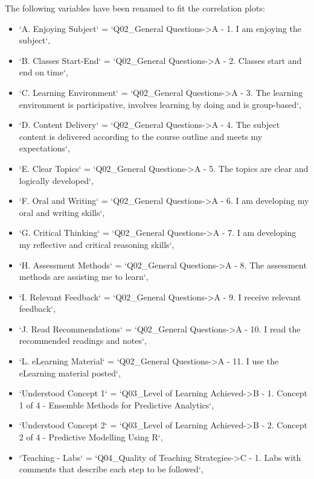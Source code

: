 \documentclass[
]{article}
\begin{document}
The following variables have been renamed to fit the correlation plots:

\begin{itemize}
\item
  `A. Enjoying Subject` = `Q02\_General Questions-\textgreater A - 1. I
  am enjoying the subject`,
\item
  `B. Classes Start-End` = `Q02\_General Questions-\textgreater A - 2.
  Classes start and end on time`,
\item
  `C. Learning Environment` = `Q02\_General Questions-\textgreater A -
  3. The learning environment is participative, involves learning by
  doing and is group-based`,
\item
  `D. Content Delivery` = `Q02\_General Questions-\textgreater A - 4.
  The subject content is delivered according to the course outline and
  meets my expectations`,
\item
  `E. Clear Topics` = `Q02\_General Questions-\textgreater A - 5. The
  topics are clear and logically developed`,
\item
  `F. Oral and Writing` = `Q02\_General Questions-\textgreater A - 6. I
  am developing my oral and writing skills`,
\item
  `G. Critical Thinking` = `Q02\_General Questions-\textgreater A - 7. I
  am developing my reflective and critical reasoning skills`,
\item
  `H. Assessment Methods` = `Q02\_General Questions-\textgreater A - 8.
  The assessment methods are assisting me to learn`,
\item
  `I. Relevant Feedback` = `Q02\_General Questions-\textgreater A - 9. I
  receive relevant feedback`,
\item
  `J. Read Recommendations` = `Q02\_General Questions-\textgreater A -
  10. I read the recommended readings and notes`,
\item
  `L. eLearning Material` = `Q02\_General Questions-\textgreater A - 11.
  I use the eLearning material posted`,
\item
  `Understood Concept 1` = `Q03\_Level of Learning
  Achieved-\textgreater B - 1. Concept 1 of 4 - Ensemble Methods for
  Predictive Analytics`,
\item
  `Understood Concept 2` = `Q03\_Level of Learning
  Achieved-\textgreater B - 2. Concept 2 of 4 - Predictive Modelling
  Using R`,
\item
  `Teaching - Labs` = `Q04\_Quality of Teaching
  Strategies-\textgreater C - 1. Labs with comments that describe each
  step to be followed`,

\end{itemize}
\end{document}
